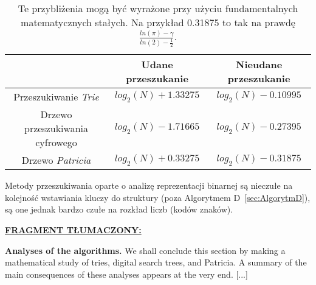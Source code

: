 	\begin{table}[htb]
		\centering
		\begin{threeparttable}
			\caption{Te przybliżenia mogą być wyrażone przy użyciu fundamentalnych matematycznych stałych. Na przykład 0.31875 to tak na prawdę $\frac{ln(\pi) - \gamma}{ln(2) - \frac{1}{2}}$.}\label{fig:PrzyblizeniaRownaniaDlaIlosciZnakowPotrzebnychDoPrzeanalizowaniaPodczasPrzeszukiwania}
			{ \small 
				\begin{tabularx}{\textwidth}{C{11.5}|C{12}|C{12}|}
					\textbf{} 				& \textbf{Udane przeszukanie} 	& \textbf{Nieudane przeszukanie} \\
					\hline \hline
					Przeszukiwanie \emph{Trie} 			& $log_2(N)+1.33275$ 			& $log_2(N)-0.10995$ \\
					\hline
					Drzewo przeszukiwania cyfrowego		& $log_2(N)-1.71665$			& $log_2(N)-0.27395$ \\
					\hline
					Drzewo \emph{Patricia} 				& $log_2(N)+0.33275$			& $log_2(N)-0.31875$ \\
				\end{tabularx} 
			}
		\end{threeparttable}
	\end{table}

    Metody przeszukiwania oparte o analizę reprezentacji binarnej są nieczułe na kolejność wstawiania kluczy do struktury (poza Algorytmem D~\ref{sec:AlgorytmD}), są one jednak bardzo czułe na rozkład liczb (kodów znaków).
	
	\ifsourcematerial
	\begin{displayquote}
		\color{ao(english)}
		\underline{\textbf{FRAGMENT TŁUMACZONY:}} \newline
		
		\textbf{Analyses of the algorithms.} \newline
		We shall conclude this section by making a
		mathematical study of tries, digital search trees, and Patricia. A summary of the main consequences of these analyses appears at the very end.
		[...]
	\end{displayquote}
	\fi

